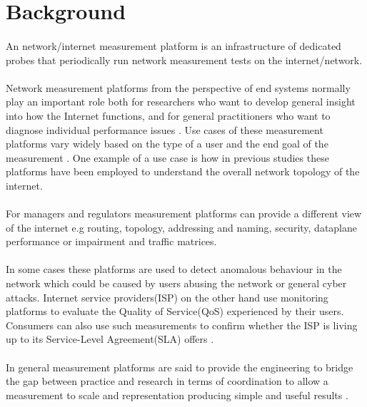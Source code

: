 \section{Background}
\paragraph{}
An network/internet measurement platform is an infrastructure of dedicated probes that periodically run network measurement tests on the internet/network\cite{7076582}.

\paragraph{}
 Network measurement platforms from the perspective of end systems normally play an important role both for researchers who want to develop general insight into how the Internet functions, and for general practitioners who want to diagnose individual performance issues \cite{Dhawan:2012:FBN:2398776.2398786}. Use cases of these measurement platforms vary widely based on the type of a user and the end goal of the measurement \cite{Ford:2018:RWR:3243157.3243167}. One example of a use case is how in  previous studies these platforms have been employed to understand the overall network topology of the internet\cite{7076582}.
\paragraph{}
For managers and regulators measurement platforms can provide a different view of the internet e.g routing, topology, addressing and naming, security, dataplane performance or impairment and traffic matrices\cite{Ford:2018:RWR:3243157.3243167}.
\paragraph{}
In some cases these platforms are used to detect anomalous behaviour in the network which could be caused by users abusing the network or general cyber attacks. Internet service providers(ISP) on the other hand use monitoring platforms to evaluate the Quality of Service(QoS) experienced by their users\cite{7076582}. Consumers can also use such measurements to confirm whether the ISP is living up to its Service-Level Agreement(SLA) offers \cite{7076582}.
\paragraph{}
In general measurement platforms are said to provide the engineering to bridge the gap between practice and research in terms of coordination to allow a measurement to scale  and representation producing simple and useful results \cite{Ford:2018:RWR:3243157.3243167}.
